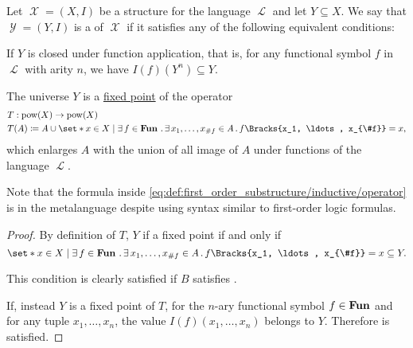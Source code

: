 \begin{definition}\label{def:first_order_substructure}
  Let \( \mscrX = (X, I) \) be a structure for the language \( \mscrL \) and let \( Y \subseteq X \). We say that \( \mscrY = (Y, I) \) is a  of \( \mscrX \) if it satisfies any of the following equivalent conditions:

  \begin{thmenum}
     If \( Y \) is closed under function application, that is, for any functional symbol \( f \) in \( \mscrL \) with arity \( n \), we have \( I(f)(Y^n) \subseteq Y \).

     The universe \( Y \) is a \hyperref[def:fixed_point]{fixed point} of the operator
    \begin{equation}\label{eq:def:first_order_substructure/inductive/operator}
      \begin{aligned}
        &T: \pow(X) \to \pow(X) \\
        &T(A) \coloneqq A \cup \set*{ x \in X \given \qexists{f \in \boldop{Fun}} \qexists{x_1, \ldots, x_{\#f} \in A} f\Bracks{x_1, \ldots, x_{\#f}} = x },
      \end{aligned}
    \end{equation}
    which enlarges \( A \) with the union of all image of \( A \) under functions of the language \( \mscrL \).

    Note that the formula inside \eqref{eq:def:first_order_substructure/inductive/operator} is in the metalanguage despite using syntax similar to first-order logic formulas.
  \end{thmenum}
\end{definition}
\begin{proof}
  By definition of \( T \), \( Y \) if a fixed point if and only if
  \begin{equation*}
    \set*{ x \in X \given \qexists{f \in \boldop{Fun}} \qexists{x_1, \ldots, x_{\#f} \in A} f\Bracks{x_1, \ldots, x_{\#f}} = x } \subseteq Y.
  \end{equation*}

  This condition is clearly satisfied if \( B \) satisfies .

  If, instead \( Y \) is a fixed point of \( T \), for the \( n \)-ary functional symbol \( f \in \operatorname{\mathbf{Fun}} \) and for any tuple \( x_1, \ldots, x_n \), the value \( I(f)(x_1, \ldots, x_n) \) belongs to \( Y \). Therefore  is satisfied.
\end{proof}

